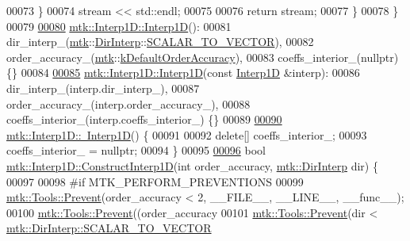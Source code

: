 \begin{DoxyCode}
00073   \}
00074   stream << std::endl;
00075 
00076   \textcolor{keywordflow}{return} stream;
00077 \}
00078 \}
00079 
\hypertarget{mtk__interp__1d_8cc_source_l00080}{}\hyperlink{classmtk_1_1Interp1D_ae56f90c53579c91c1dbe715f7e7361be}{00080} \hyperlink{classmtk_1_1Interp1D_ae56f90c53579c91c1dbe715f7e7361be}{mtk::Interp1D::Interp1D}():
00081   dir\_interp\_(\hyperlink{namespacemtk}{mtk}::\hyperlink{group__c02-enums_ga674ec67bd1baa04e5dc06c2bcc351972}{DirInterp}::\hyperlink{namespacemtk_ga674ec67bd1baa04e5dc06c2bcc351972a53facfbeb6725b2bd220c8d9811a0673}{SCALAR\_TO\_VECTOR}),
00082   order\_accuracy\_(\hyperlink{namespacemtk}{mtk}::\hyperlink{group__c01-roots_ga0d95560098eb36420511103637b6952f}{kDefaultOrderAccuracy}),
00083   coeffs\_interior\_(nullptr) \{\}
00084 
\hypertarget{mtk__interp__1d_8cc_source_l00085}{}\hyperlink{classmtk_1_1Interp1D_a92a5ed77144b3824d201a586f4072fd0}{00085} \hyperlink{classmtk_1_1Interp1D_ae56f90c53579c91c1dbe715f7e7361be}{mtk::Interp1D::Interp1D}(\textcolor{keyword}{const} \hyperlink{classmtk_1_1Interp1D}{Interp1D} &interp):
00086   dir\_interp\_(interp.dir\_interp\_),
00087   order\_accuracy\_(interp.order\_accuracy\_),
00088   coeffs\_interior\_(interp.coeffs\_interior\_) \{\}
00089 
\hypertarget{mtk__interp__1d_8cc_source_l00090}{}\hyperlink{classmtk_1_1Interp1D_a52ea06b5e3d7082eb06ade256f4e30fb}{00090} \hyperlink{classmtk_1_1Interp1D_a52ea06b5e3d7082eb06ade256f4e30fb}{mtk::Interp1D::~Interp1D}() \{
00091 
00092   \textcolor{keyword}{delete}[] coeffs\_interior\_;
00093   coeffs\_interior\_ = \textcolor{keyword}{nullptr};
00094 \}
00095 
\hypertarget{mtk__interp__1d_8cc_source_l00096}{}\hyperlink{classmtk_1_1Interp1D_ace09ceeb508afde5d95f20a8e73d5315}{00096} \textcolor{keywordtype}{bool} \hyperlink{classmtk_1_1Interp1D_ace09ceeb508afde5d95f20a8e73d5315}{mtk::Interp1D::ConstructInterp1D}(\textcolor{keywordtype}{int} order\_accuracy, 
      \hyperlink{group__c02-enums_ga674ec67bd1baa04e5dc06c2bcc351972}{mtk::DirInterp} dir) \{
00097 
00098 \textcolor{preprocessor}{  #if MTK\_PERFORM\_PREVENTIONS}
00099   \hyperlink{classmtk_1_1Tools_a332324c6f25e66be9dff48c5987a3b9f}{mtk::Tools::Prevent}(order\_accuracy < 2, \_\_FILE\_\_, \_\_LINE\_\_, \_\_func\_\_);
00100   \hyperlink{classmtk_1_1Tools_a332324c6f25e66be9dff48c5987a3b9f}{mtk::Tools::Prevent}((order\_accuracy%
00101   \hyperlink{classmtk_1_1Tools_a332324c6f25e66be9dff48c5987a3b9f}{mtk::Tools::Prevent}(dir < \hyperlink{namespacemtk_ga674ec67bd1baa04e5dc06c2bcc351972a53facfbeb6725b2bd220c8d9811a0673}{mtk::DirInterp::SCALAR\_TO\_VECTOR}

\end{DoxyCode}
